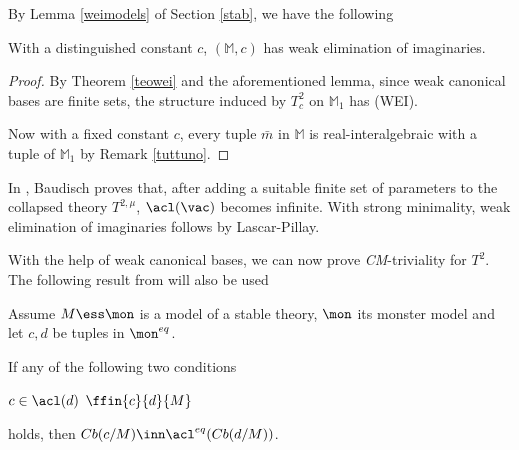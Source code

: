 \medskip
By Lemma \ref{weimodels} of Section \ref{stab}, we have the following
\begin{cor}\label{weiuno}
With a distinguished constant $c$, $(\mathbb{M},c)$ has weak elimination of imaginaries.
\end{cor}
\begin{proof}
By Theorem \ref{teowei} and the aforementioned lemma, since weak canonical bases
are finite sets, the structure induced by $T^{2}_{c}$ on $\mathbb{M}_{1}$ has (WEI).

\smallskip
Now with a fixed constant $c$, every tuple $\bar m$ in $\mathbb{M}$ is real-interalgebraic
with a tuple of $\mathbb{M}_{1}$ by Remark \ref{tuttuno}.
\end{proof}
In \cite{bad}, Baudisch proves that, after adding a suitable finite set of parameters to the collapsed
theory $T^{2,\mu}$, $\acl(\vac)$ becomes infinite. With strong minimality, weak elimination of imaginaries follows by Lascar-Pillay.

\medskip
With the help of weak canonical bases, we can now prove {\sl CM}-triviality for $T^{2}$.
The following result from \cite{pilcm} will also be used
\begin{fact}\label{pilcb}
Assume $M\ess\mon$ is a model of a stable theory, $\mon$ its monster model and let $c,d$ be tuples in $\mon^{eq}$.

If any of the following two conditions
\begin{itemize}
$c\in\acl(d)$ %
$\ffin{c}{d}{M}$ %
\end{itemize}
holds, then $Cb(c/M)\inn\acl^{eq}(Cb(d/M))$.
\end{fact}

